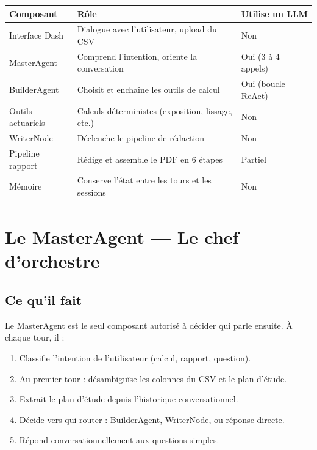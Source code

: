 \documentclass[12pt,a4paper]{article}
\begin{document}
\begin{center}
\begin{tabular}{p{3.2cm} p{6.5cm} p{3cm}}
\toprule
\textbf{Composant} & \textbf{Rôle} & \textbf{Utilise un LLM} \\
\midrule
Interface Dash    & Dialogue avec l'utilisateur, upload du CSV     & Non \\
\addlinespace
MasterAgent       & Comprend l'intention, oriente la conversation  & Oui (3 à 4 appels) \\
\addlinespace
BuilderAgent      & Choisit et enchaîne les outils de calcul       & Oui (boucle ReAct) \\
\addlinespace
Outils actuariels & Calculs déterministes (exposition, lissage, etc.) & Non \\
\addlinespace
WriterNode        & Déclenche le pipeline de rédaction             & Non \\
\addlinespace
Pipeline rapport  & Rédige et assemble le PDF en 6 étapes          & Partiel \\
\addlinespace
Mémoire           & Conserve l'état entre les tours et les sessions & Non \\
\bottomrule
\end{tabular}
\end{center}

\newpage

\section{Le MasterAgent — Le chef d'orchestre}

\subsection{Ce qu'il fait}

Le MasterAgent est le seul composant autorisé à décider qui parle ensuite.
À chaque tour, il :

\begin{enumerate}[leftmargin=2em]
  \item Classifie l'intention de l'utilisateur (calcul, rapport, question).
  \item Au premier tour : désambiguïse les colonnes du CSV et le plan d'étude.
  \item Extrait le plan d'étude depuis l'historique conversationnel.
  \item Décide vers qui router : BuilderAgent, WriterNode, ou réponse directe.
  \item Répond conversationnellement aux questions simples.
\end{enumerate}
\end{document}
